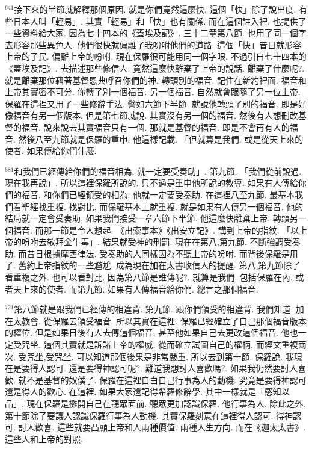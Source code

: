 \documentclass{book}
\begin{document}
$^{641}$接下來的半節就解釋那個原因.
就是你們竟然這麼快.
這個「快」除了說出度.
有些日本人叫「輕易」.
其實「輕易」和「快」也有關係.
而在這個註入裡.
也提供了一些資料給大家.
因為七十四本的《蓋埃及記》.
三十二章第八節.
也用了同一個字去形容那些異色人.
他們很快就偏離了我吩咐他們的道路.
這個「快」昔日就形容上帝的子民.
偏離上帝的吩咐.
現在保羅很可能用同一個字眼.
不過引自七十四本的《蓋埃及記》.
去描述那些修信人.
竟然這麼快離棄了上帝的說話.
離棄了什麼呢?.
就是離棄那位藉著基督恩典呼召你們的神.
轉頭別的福音.
記住在新約裡面.
福音和上帝其實密不可分.
你轉了別一個福音.
另一個福音.
自然就會跟隨了另一位上帝.
保羅在這裡又用了一些修辭手法.
譬如六節下半節.
就說他轉頭了別的福音.
即是好像福音有另一個版本.
但是第七節就說.
其實沒有另一個的福音.
然後有人想刪改基督的福音.
說來說去其實福音只有一個.
那就是基督的福音.
即是不會再有人的福音.
然後八至九節就是保羅的重申.
他這樣記載.
「但就算是我們.
或是從天上來的使者.
如果傳給你們什麼.

$^{681}$和我們已經傳給你們的福音相為.
就一定要受奏助」.
第九節.
「我們從前說過.
現在我再說」.
所以這裡保羅所說的.
只不過是重申他所說的教導.
如果有人傳給你們的福音.
和你們已經領受的相為.
他就一定要受奏助.
在這裡八至九節.
最基本我們看聖經找重複.
找對比.
而保羅基本上就重複.
就是如果有人傳另一個福音.
他的結局就一定會受奏助.
如果我們接受一章六節下半節.
他這麼快離棄上帝.
轉頭另一個福音.
而那一節是令人想起.
《出索事本》《出安立記》.
講到上帝的指紋.
「以上帝的吩咐去敬拜金牛毒」.
結果就受神的刑罰.
現在在第八,第九節.
不斷強調受奏助.
而昔日根據摩西律法.
受奏助的人同樣因為不聽上帝的吩咐.
而背後保羅是用了.
舊約上帝指紋的一些尷尬.
成為現在加在太書收信人的提醒.
第八,第九節除了看重複之外.
也可以看對比.
因為第八節是誰傳呢?.
就算是我們.
包括保羅在內.
或者天上來的使者.
而第九節.
如果有人傳福音給你們.
總言之那個福音.

$^{721}$第八節就是跟我們已經傳的相違背.
第九節.
跟你們領受的相違背.
我們知道.
加在太教會.
從保羅去領受福音.
所以其實在這裡.
保羅已經確立了自己那個福音版本的權位.
但是如果日後有人去傳這個福音.
甚至他如果自己去更改這個福音.
他也一定受咒坐.
這個其實就是訴諸上帝的權威.
從而確立試圖自己的權柄.
而經文重複兩次.
受咒坐,受咒坐.
可以知道那個後果是非常嚴重.
所以去到第十節.
保羅說.
我現在是要得人認可.
還是要得神認可呢?.
難道我想討人喜歡嗎?.
如果我仍然要討人喜歡.
就不是基督的奴僕了.
保羅在這裡自白自己行事為人的動機.
究竟是要得神認可還是得人的歡心.
在這裡.
如果大家還記得希羅修辭學.
其中一樣就是「感知以品」.
現在保羅是攤開自己在聽眾面前.
聽眾更加認識保羅.
他行事為人.
除此之外.
第十節除了要讓人認識保羅行事為人動機.
其實保羅刻意在這裡得人認可.
得神認可.
討人歡喜.
這些就要凸顯上帝和人兩種價值.
兩種人生方向.
而在《迦太太書》.
這些人和上帝的對照.
\end{document}
